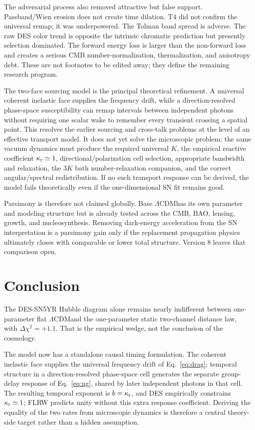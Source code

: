 \documentclass[11pt]{article}
\newcommand{\LCDM}{$\Lambda$CDM}
\newcommand{\kreact}{\kappa_{\rm r}}
\begin{document}
The adversarial process also removed attractive but false support. Passband/Wien erosion does not create time dilation. T4 did not confirm the universal remap; it was underpowered. The Tolman band spread is adverse. The raw DES color trend is opposite the intrinsic chromatic prediction but presently selection dominated. The forward energy loss is larger than the non-forward loss and creates a serious CMB number-normalization, thermalization, and anisotropy debt. These are not footnotes to be edited away; they define the remaining research program.

The two-face sourcing model is the principal theoretical refinement. A universal coherent inelastic face supplies the frequency drift, while a direction-resolved phase-space susceptibility can remap intervals between independent photons without requiring one scalar wake to remember every transient crossing a spatial point. This resolves the earlier sourcing and cross-talk problems at the level of an effective transport model. It does not yet solve the microscopic problem: the same vacuum dynamics must produce the required universal $K$, the empirical reactive coefficient $\kreact\simeq1$, directional/polarization cell selection, appropriate bandwidth and relaxation, the $3K$ bath number-relaxation companion, and the correct angular/spectral redistribution. If no such transport response can be derived, the model fails theoretically even if the one-dimensional SN fit remains good.

Parsimony is therefore not claimed globally. Base \LCDM has its own parameter and modeling structure but is already tested across the CMB, BAO, lensing, growth, and nucleosynthesis. Removing dark-energy acceleration from the SN interpretation is a parsimony gain only if the replacement propagation physics ultimately closes with comparable or lower total structure. Version 8 leaves that comparison open.

\section{Conclusion}
The DES-SN5YR Hubble diagram alone remains nearly indifferent between one-parameter flat \LCDM and the one-parameter static two-channel distance law, with $\Delta\chi^2=+1.1$. That is the empirical wedge, not the conclusion of the cosmology.

The model now has a standalone causal timing formulation. The coherent inelastic face supplies the universal frequency drift of Eq.~\eqref{eq:drag}; temporal structure in a direction-resolved phase-space cell generates the separate group-delay response of Eq.~\eqref{eq:ng}, shared by later independent photons in that cell. The resulting temporal exponent is $b=\kreact$, and DES empirically constrains $\kreact\simeq1$; FLRW predicts unity without this extra response coefficient. Deriving the equality of the two rates from microscopic dynamics is therefore a central theory-side target rather than a hidden assumption.
\end{document}
